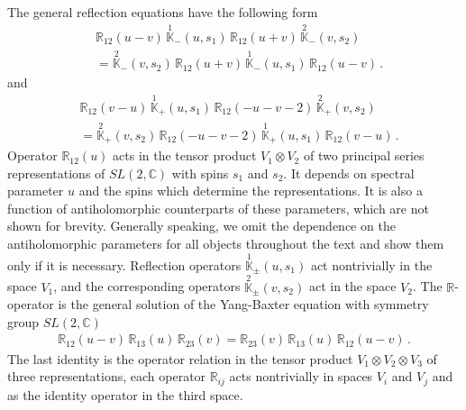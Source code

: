 \documentclass[a4paper,11pt]{article}
\numberwithin{equation}{section}
\begin{document}
The general reflection equations have the following form \cite{Skl:Boundary,PP,Oliv}
\begin{align}
	& \nonumber
	\mathbb{R}_{12}(u-v)\,\overset{1}{\mathbb{K}}_-(u,s_1)\,\mathbb{R}_{12}(u+v)\,\overset{2}{\mathbb{K}}_-(v,s_2) \\
	& \label{Refl}
	=
	\overset{2}{\mathbb{K}}_-(v,s_2)\,\mathbb{R}_{12}(u+v)\,\overset{1}{\mathbb{K}}_-(u,s_1)\,\mathbb{R}_{12}(u-v) \,.
\end{align}
and 
\begin{align}
	& \nonumber
	\mathbb{R}_{12}(v-u)\,\overset{1}{\mathbb{K}}_+(u,s_1)\,\mathbb{R}_{12}(-u-v-2)\,\overset{2}{\mathbb{K}}_+(v,s_2) \\
	& \label{Refl+}
	=
	\overset{2}{\mathbb{K}}_+(v,s_2)\,\mathbb{R}_{12}(-u-v-2)\,\overset{1}{\mathbb{K}}_+(u,s_1)\,\mathbb{R}_{12}(v-u) \,.
\end{align}
Operator $\mathbb{R}_{12}(u)$ acts in the tensor product $V_1\otimes V_2$ of two principal series representations of $SL(2,\mathbb{C})$ with spins $s_1$ and $s_2$.
It depends on spectral parameter $u$ and the spins which determine the representations.
It is also a function of antiholomorphic counterparts of these parameters, which are not shown for brevity.
Generally speaking, we omit the dependence on the antiholomorphic parameters for all objects throughout the text and show them only if it is necessary.
Reflection operators $\overset{1}{\mathbb{K}}_{\pm}(u,s_1)$ act nontrivially in the space $V_1$, and the corresponding operators $\overset{2}{\mathbb{K}}_{\pm}(v,s_2)$ act in the space $V_2$.
The $\mathbb{R}$-operator is the general solution of the Yang-Baxter equation with symmetry group $SL(2,\mathbb{C})$~\cite{DM09,DKM,Derkachov:2005hw}
\begin{align} \label{YBgen}
	\mathbb{R}_{12}(u-v)\,\mathbb{R}_{13}(u)\,\mathbb{R}_{23}(v) = 
	\mathbb{R}_{23}(v)\,\mathbb{R}_{13}(u)\,\mathbb{R}_{12}(u-v) \,.
\end{align}
The last identity is the operator relation in the tensor product $V_1\otimes V_2\otimes V_3$ of three representations, each operator $\mathbb{R}_{ij}$ acts nontrivially in spaces $V_i$ and $V_j$ and as the identity operator in the third space.
\end{document}
